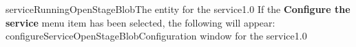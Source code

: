 %
{serviceRunningOpenStageBlob}{The \emph{\MMMU} entity for the \emph{\OSBI} service}{1.0}
\condPage{}
If the \textbf{Configure the service} menu item has been selected, the following will
appear:
%
{configureServiceOpenStageBlob}{Configuration window for the \emph{\OSBI} service}{1.0}
\secondaryEnd
\primaryEnd{}
